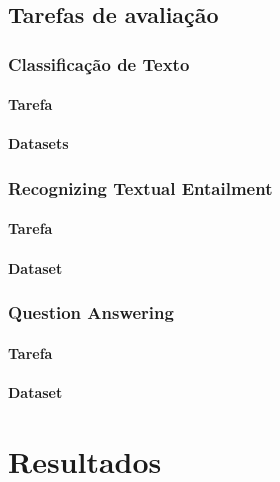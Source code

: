 \documentclass[cic,tc]{iiufrgs}
\begin{document}
\section{Tarefas de avaliação}
\subsection{Classificação de Texto}
\subsubsection{Tarefa}
\subsubsection{Datasets}
\subsection{Recognizing Textual Entailment}
\subsubsection{Tarefa}
\subsubsection{Dataset}
\subsection{Question Answering}
\subsubsection{Tarefa}
\subsubsection{Dataset}

\chapter{Resultados}



\end{document}
